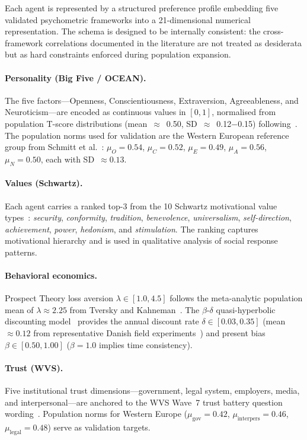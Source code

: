 \documentclass[sustainability,article,submit,pdftex,moreauthors]{Definitions/mdpi}
\begin{document}
Each agent is represented by a structured preference profile embedding five
validated psychometric frameworks into a 21-dimensional numerical representation.
The schema is designed to be internally consistent: the cross-framework
correlations documented in the literature are not treated as desiderata but
as hard constraints enforced during population expansion.

\paragraph{Personality (Big Five / OCEAN).}
The five factors---Openness, Conscientiousness, Extraversion, Agreeableness,
and Neuroticism---are encoded as continuous values in $[0,1]$, normalised from
population T-score distributions (mean~$\approx$~0.50, SD~$\approx$~0.12$-$0.15)
following~\cite{costa1992neopersonality,schmitt2007geographic}. The population
norms used for validation are the Western European reference group from
Schmitt et al.~\cite{schmitt2007geographic}: $\mu_O = 0.54$, $\mu_C = 0.52$,
$\mu_E = 0.49$, $\mu_A = 0.56$, $\mu_N = 0.50$, each with SD~$\approx 0.13$.

\paragraph{Values (Schwartz).}
Each agent carries a ranked top-3 from the 10 Schwartz motivational value
types~\cite{schwartz1992universals}: \textit{security}, \textit{conformity},
\textit{tradition}, \textit{benevolence}, \textit{universalism},
\textit{self-direction}, \textit{achievement}, \textit{power},
\textit{hedonism}, and \textit{stimulation}. The ranking captures motivational
hierarchy and is used in qualitative analysis of social response patterns.

\paragraph{Behavioral economics.}
Prospect Theory loss aversion $\lambda \in [1.0, 4.5]$ follows the
meta-analytic population mean of $\lambda \approx 2.25$ from
Tversky and Kahneman~\cite{tversky1992advances}. The $\beta$-$\delta$
quasi-hyperbolic discounting model~\cite{laibson1997golden} provides the
annual discount rate $\delta \in [0.03, 0.35]$ (mean $\approx 0.12$ from
representative Danish field experiments~\cite{andersen2008eliciting}) and
present bias $\beta \in [0.50, 1.00]$ ($\beta = 1.0$ implies time
consistency).

\paragraph{Trust (WVS).}
Five institutional trust dimensions---government, legal system, employers,
media, and interpersonal---are anchored to the WVS Wave~7 trust battery
question wording~\cite{inglehart2020worldvalues}. Population norms for
Western Europe ($\mu_\text{gov} = 0.42$, $\mu_\text{interpers} = 0.46$,
$\mu_\text{legal} = 0.48$) serve as validation targets.
\end{document}
